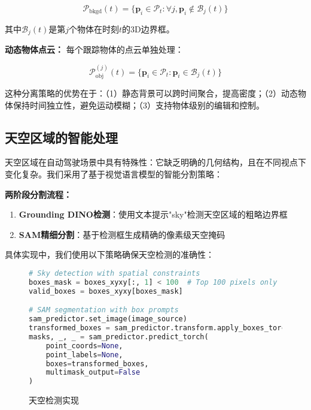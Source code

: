 \begin{equation}
\mathcal{P}_{\text{bkgd}}(t) = \{\mathbf{p}_i \in \mathcal{P}_t : \forall j, \mathbf{p}_i \notin \mathcal{B}_j(t)\}
\label{eq:background_points}
\end{equation}

其中$\mathcal{B}_j(t)$是第$j$个物体在时刻$t$的3D边界框。

\textbf{动态物体点云：}
每个跟踪物体的点云单独处理：

\begin{equation}
\mathcal{P}_{\text{obj}}^{(j)}(t) = \{\mathbf{p}_i \in \mathcal{P}_t : \mathbf{p}_i \in \mathcal{B}_j(t)\}
\label{eq:object_points}
\end{equation}

这种分离策略的优势在于：（1）静态背景可以跨时间聚合，提高密度；（2）动态物体保持时间独立性，避免运动模糊；（3）支持物体级别的编辑和控制。

\subsection{天空区域的智能处理}

天空区域在自动驾驶场景中具有特殊性：它缺乏明确的几何结构，且在不同视点下变化复杂。我们采用了基于视觉语言模型的智能分割策略：

\textbf{两阶段分割流程：}
\begin{enumerate}
\item \textbf{Grounding DINO检测}：使用文本提示"sky"检测天空区域的粗略边界框
\item \textbf{SAM精细分割}：基于检测框生成精确的像素级天空掩码
\end{enumerate}

具体实现中，我们使用以下策略确保天空检测的准确性：

\begin{figure}[!b]
  \begin{tmpbox}
    \begin{lstlisting}[language=Python]
# Sky detection with spatial constraints
boxes_mask = boxes_xyxy[:, 1] < 100  # Top 100 pixels only
valid_boxes = boxes_xyxy[boxes_mask]

# SAM segmentation with box prompts
sam_predictor.set_image(image_source)
transformed_boxes = sam_predictor.transform.apply_boxes_torch(valid_boxes, image_source.shape[:2])
masks, _, _ = sam_predictor.predict_torch(
    point_coords=None,
    point_labels=None, 
    boxes=transformed_boxes,
    multimask_output=False
)
\end{lstlisting}
  \end{tmpbox}
  \caption{天空检测实现}
  \label{fig:sky-detection-code}
\end{figure}

